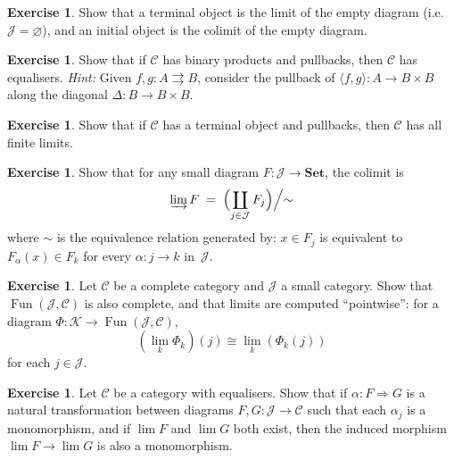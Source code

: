 \documentclass[a4paper,12pt]{book}
\DeclareMathOperator{\Fun}{Fun}
\newcommand{\Set}{\mathbf{Set}}
\theoremstyle{definition}
\newtheorem{exercise}[definition]{Exercise}
\theoremstyle{plain}
\theoremstyle{remark}
\begin{document}
\begin{exercise}\label{exer:terminal-limit}
Show that a terminal object is the limit of the empty diagram
(i.e.\ $\mathcal{J} = \varnothing$), and an initial object is the
colimit of the empty diagram.
\end{exercise}

\begin{exercise}\label{exer:equaliser-from-pullback}
Show that if $\mathcal{C}$ has binary products and pullbacks,
then $\mathcal{C}$ has equalisers.
\emph{Hint:} Given $f,g\colon A\rightrightarrows B$, consider the
pullback of $\langle f,g\rangle\colon A\to B\times B$ along
the diagonal $\Delta\colon B\to B\times B$.
\end{exercise}

\begin{exercise}\label{exer:product-from-pullback}
Show that if $\mathcal{C}$ has a terminal object and pullbacks,
then $\mathcal{C}$ has all finite limits.
\end{exercise}

\begin{exercise}\label{exer:colimit-in-set}
\index{colimit!in Set@in $\Set$}
Show that for any small diagram $F\colon\mathcal{J}\to\Set$,
the colimit is
\[
    \varinjlim F \;=\;
    \Bigl(\coprod_{j\in\mathcal{J}} F_j\Bigr)\Big/{\sim}
\]
where $\sim$ is the equivalence relation generated by:
$x\in F_j$ is equivalent to $F_\alpha(x)\in F_k$ for every
$\alpha\colon j\to k$ in~$\mathcal{J}$.
\end{exercise}

\begin{exercise}\label{exer:limit-functor-category}
Let $\mathcal{C}$ be a complete category and $\mathcal{J}$ a small category.
Show that $\Fun(\mathcal{J},\mathcal{C})$ is also complete,
and that limits are computed ``pointwise'': for a diagram
$\Phi\colon\mathcal{K}\to\Fun(\mathcal{J},\mathcal{C})$,
\[
    (\lim_k \Phi_k)(j) \cong \lim_k(\Phi_k(j))
\]
for each $j\in\mathcal{J}$.
\end{exercise}

\begin{exercise}\label{exer:limit-preserves-mono}
Let $\mathcal{C}$ be a category with equalisers.
Show that if $\alpha\colon F\Rightarrow G$ is a natural transformation
between diagrams $F,G\colon\mathcal{J}\to\mathcal{C}$ such that each
$\alpha_j$ is a monomorphism, and if $\lim F$ and $\lim G$ both exist,
then the induced morphism $\lim F\to\lim G$ is also a monomorphism.
\end{exercise}
\end{document}
